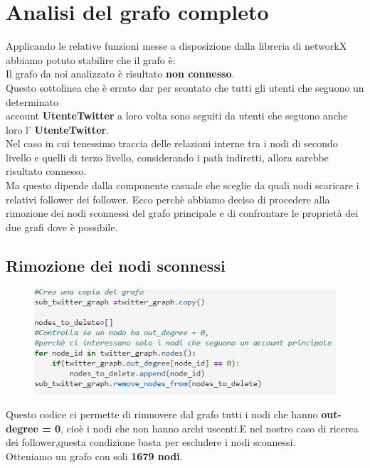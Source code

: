 \documentclass[a4paper,11pt]{report}
\begin{document}
\section{Analisi del grafo completo}
Applicando le relative funzioni messe a disposizione dalla libreria di networkX abbiamo potuto stabilire che il grafo è:\\
Il grafo da noi analizzato è risultato \textbf{non connesso}.\\
Questo sottolinea che è errato dar per scontato che tutti gli utenti che seguono un determinato \\account \textbf{UtenteTwitter} a loro volta sono seguiti da utenti che seguono anche loro l' \textbf{UtenteTwitter}. \newline \\Nel caso in cui tenessimo traccia delle relazioni interne tra i nodi di secondo livello e quelli di terzo livello, considerando i path indiretti, allora sarebbe risultato connesso.\\ Ma questo dipende dalla componente casuale che sceglie da quali nodi scaricare i relativi follower dei follower.\newline
Ecco perchè abbiamo deciso di procedere alla rimozione dei nodi sconnessi del grafo principale e di confrontare le proprietà dei due grafi dove è possibile.

\subsection{Rimozione dei nodi sconnessi}
\begin{figure}[h]
	\centering
	\includegraphics[width=0.6\linewidth]{rimozione_nodi_sconnessi}
	\label{fig:rimozionenodisconnessi}
\end{figure}
Questo codice ci permette di rimuovere dal grafo tutti i nodi che hanno \textbf{out-degree = 0}, cioè i nodi che non hanno archi uscenti.E nel nostro caso di ricerca dei follower,questa condizione basta per escludere i nodi sconnessi.\\
Otteniamo un grafo con soli \textbf{1679 nodi}.
\end{document}
